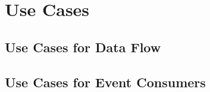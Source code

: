 \section{Use Cases}

\subsection{Use Cases for Data Flow}


\subsection{Use Cases for Event Consumers}

